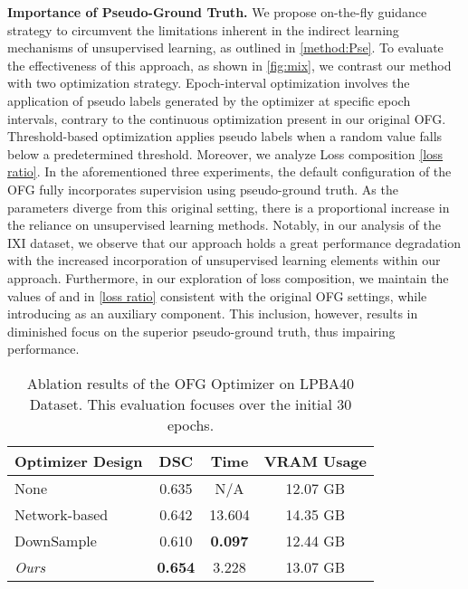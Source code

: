 \documentclass[10pt,twocolumn,letterpaper]{article}
\begin{document}
\textbf{Importance of Pseudo-Ground Truth.} We propose on-the-fly guidance strategy to circumvent the limitations inherent in the indirect learning mechanisms of unsupervised learning, as outlined in \cref{method:Pse}. To evaluate the effectiveness of this approach, as shown in \cref{fig:mix}, we contrast our method with two optimization strategy. Epoch-interval optimization involves the application of pseudo labels generated by the optimizer at specific epoch intervals, contrary to the continuous optimization present in our original OFG. Threshold-based optimization applies pseudo labels when a random value falls below a predetermined threshold. Moreover, we analyze Loss composition \cref{loss ratio}.
In the aforementioned three experiments, the default configuration of the OFG fully incorporates supervision using pseudo-ground truth. As the parameters diverge from this original setting, there is a proportional increase in the reliance on unsupervised learning methods.
Notably, in our analysis of the IXI dataset, we observe that our approach holds a great performance degradation with the increased incorporation of unsupervised learning elements within our approach.
Furthermore, in our exploration of loss composition, we maintain the values of  and  in \cref{loss ratio} consistent with the original OFG settings, while introducing  as an auxiliary component. This inclusion, however, results in diminished focus on the superior pseudo-ground truth, thus impairing performance.



\begin{table}
  \centering
  \small{
  \begin{tabular}{lccc}
    \toprule
    Optimizer Design &  DSC & Time & VRAM Usage \\
    \midrule
    None & 0.635 & N/A & 12.07 GB \\
    Network-based & 0.642 & 13.604 & 14.35 GB \\
    DownSample & 0.610 & \textbf{0.097} & 12.44 GB \\
    \midrule
    \textit{Ours} & \textbf{0.654} & 3.228 & 13.07 GB \\
    \bottomrule
  \end{tabular}
  }
  \caption{Ablation results of the OFG Optimizer on LPBA40 Dataset. This evaluation focuses over the initial 30 epochs.}
  \label{tab:ablation}
\end{table}
\end{document}
